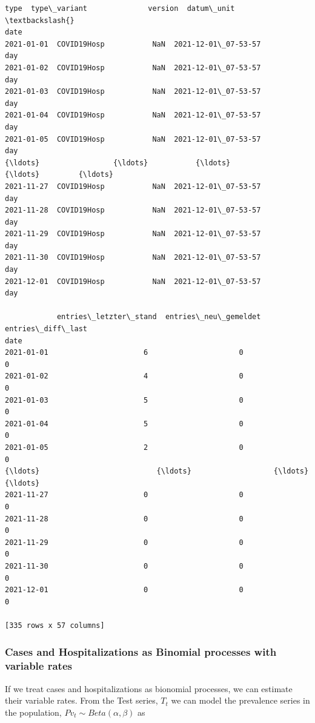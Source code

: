 \documentclass[11pt]{article}
\begin{document}
\begin{tcolorbox}[breakable, size=fbox, boxrule=.5pt, pad at break*=1mm, opacityfill=0]
\begin{Verbatim}[commandchars=\\\{\}]
                   type  type\_variant              version  datum\_unit  \textbackslash{}
date
2021-01-01  COVID19Hosp           NaN  2021-12-01\_07-53-57         day
2021-01-02  COVID19Hosp           NaN  2021-12-01\_07-53-57         day
2021-01-03  COVID19Hosp           NaN  2021-12-01\_07-53-57         day
2021-01-04  COVID19Hosp           NaN  2021-12-01\_07-53-57         day
2021-01-05  COVID19Hosp           NaN  2021-12-01\_07-53-57         day
{\ldots}                 {\ldots}           {\ldots}                  {\ldots}         {\ldots}
2021-11-27  COVID19Hosp           NaN  2021-12-01\_07-53-57         day
2021-11-28  COVID19Hosp           NaN  2021-12-01\_07-53-57         day
2021-11-29  COVID19Hosp           NaN  2021-12-01\_07-53-57         day
2021-11-30  COVID19Hosp           NaN  2021-12-01\_07-53-57         day
2021-12-01  COVID19Hosp           NaN  2021-12-01\_07-53-57         day

            entries\_letzter\_stand  entries\_neu\_gemeldet  entries\_diff\_last
date
2021-01-01                      6                     0                  0
2021-01-02                      4                     0                  0
2021-01-03                      5                     0                  0
2021-01-04                      5                     0                  0
2021-01-05                      2                     0                  0
{\ldots}                           {\ldots}                   {\ldots}                {\ldots}
2021-11-27                      0                     0                  0
2021-11-28                      0                     0                  0
2021-11-29                      0                     0                  0
2021-11-30                      0                     0                  0
2021-12-01                      0                     0                  0

[335 rows x 57 columns]
\end{Verbatim}
\end{tcolorbox}
        
    \hypertarget{cases-and-hospitalizations-as-binomial-processes-with-variable-rates}{%
\subsubsection{Cases and Hospitalizations as Binomial processes with
variable
rates}\label{cases-and-hospitalizations-as-binomial-processes-with-variable-rates}}

If we treat cases and hospitalizations as bionomial processes, we can
estimate their variable rates. From the Test series, \(T_t\) we can
model the prevalence series in the population,
\(Pv_t \sim Beta (\alpha, \beta)\) as
\end{document}
